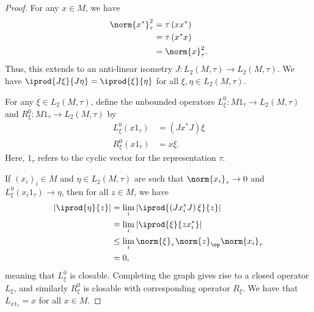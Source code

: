 \documentclass[10pt]{mypackage}
\begin{document}
\begin{proof}
  For any $x\in M$, we have
  \begin{align*}
    \norm{x^{\ast}}_{\tau}^2 &= \tau\left( xx^{\ast} \right)\\
                             &= \tau\left( x^{\ast}x \right)\\
                             &= \norm{x}_{\tau}^2.
  \end{align*}
  Thus, this extends to an anti-linear isometry $J\colon L_2\left( M,\tau \right)\rightarrow L_2\left( M,\tau \right)$. We have $ \iprod{J\xi}{J\eta} = \iprod{\xi}{\eta} $ for all $\xi,\eta\in L_2\left( M,\tau \right)$.

  For any $\xi\in L_2\left( M,\tau \right)$, define the unbounded operators $L_{\xi}^{0}\colon M1_{\tau}\rightarrow L_2\left( M,\tau \right)$ and $R_{\xi}^{0}\colon M1_{\tau}\rightarrow L_2\left( M,\tau \right)$ by
  \begin{align*}
    L_{\xi}^0\left( x1_{\tau} \right) &= \left( Jx^{\ast}J \right)\xi\\
    R_{\xi}^{0}\left( x1_{\tau} \right) &= x\xi.
  \end{align*}
  Here, $1_{\tau}$ refers to the cyclic vector for the representation $\tau$.

  If $\left( x_i \right)_i\in M$ and $\eta\in L_2\left( M,\tau \right)$ are such that $\norm{x_i}_{\tau}\rightarrow 0$ and $L_{\xi}^0\left( x_i1_{\tau} \right)\rightarrow\eta$, then for all $z\in M$, we have
  \begin{align*}
    \left\vert \iprod{\eta}{z} \right\vert &= \lim_{i} \left\vert \iprod{\left( Jx_i^{\ast}J \right)\xi}{z} \right\vert\\
                                           &= \lim_{i} \left\vert \iprod{\xi}{zx_i^{\ast}} \right\vert\\
                                           &\leq \lim_{i} \norm{\xi}_{\tau}\norm{z}_{\op}\norm{x_i}_{\tau}\\
                                           &= 0,
  \end{align*}
  meaning that $L_{\xi}^0$ is closable. Completing the graph gives rise to a closed operator $L_{\xi}$, and similarly $R_{\xi}^0$ is closable with corresponding operator $R_{\xi}$. We have that $L_{x1_{\tau}} = x$ for all $x\in M$.


\end{proof}
\end{document}
